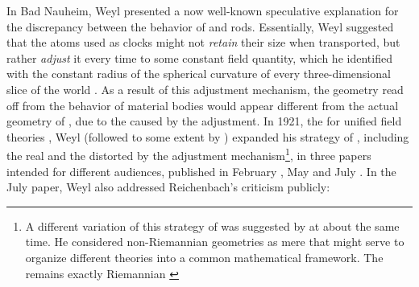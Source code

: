\documentclass[final]{article}
\begin{document}
In Bad Nauheim, Weyl presented a now well-known speculative explanation for the discrepancy between the behavior of  and  rods. Essentially, Weyl suggested that the atoms used as clocks might not \emph{retain} their size when transported, but rather \emph{adjust} it every time to some constant field quantity, which he identified with the constant radius of the spherical curvature of every three-dimensional slice of the world \citep{Weyl1920a}. As a result of this adjustment mechanism, the geometry read off from the behavior of material bodies would appear different from the actual geometry of \spti, due to the  caused by the adjustment. In 1921, the  for unified field theories \citep[ch.\ 4]{Vizgin1994}, Weyl (followed to some extent by \cite{Eddington1921,Eddington1921a}) expanded his strategy of , including the real  and the  distorted by the adjustment mechanism\footnote{A different variation of this strategy of  was suggested by \citet{Eddington1921} at about the same time. He considered non-Riemannian geometries as mere  that might serve to organize different theories into a common mathematical framework. The  remains exactly Riemannian \citep{Eddington1921}}, in three papers intended for different audiences, published in February \citep{Weyl1921a}, May \citep{Weyl1921d} and July \citep{Weyl1921e}. In the July paper, Weyl also addressed Reichenbach's criticism publicly:
\end{document}
